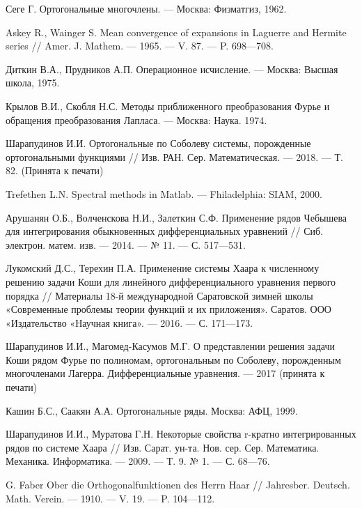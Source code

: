 \begin{thebibliography}{111}
{Сеге Г.}
Ортогональные многочлены. --- Москва: Физматгиз, 1962.


{Askey R., Wainger S.}
Mean convergence of expansions in Laguerre and Hermite series // Amer. J. Mathem. --- 1965. --- V. 87. --- P. 698---708.


{Диткин В.А., Прудников А.П.}
Операционное исчисление. --- Москва: Высшая школа, 1975.


{Крылов В.И., Скобля Н.С.}
Методы приближенного преобразования Фурье и обращения преобразования Лапласа. --- Москва: Наука. 1974.


Шарапудинов И.И. Ортогональные  по Соболеву системы, порожденные ортогональными функциями // Изв. РАН. Сер. Математическая. --- 2018. --- Т. 82. (Принята к печати)


{Trefethen  L.N.}
Spectral methods in Matlab. --- Fhiladelphia: SIAM, 2000.


{Арушанян О.Б., Волченскова Н.И., Залеткин С.Ф.}
Применение рядов Чебышева для интегрирования обыкновенных дифференциальных уравнений // Сиб. электрон. матем. изв. --- 2014. --- № 11. --- С. 517---531.


{Лукомский Д.С., Терехин П.А.}
Применение системы Хаара к численному решению задачи Коши для линейного дифференциального уравнения первого порядка // Материалы 18-й международной Саратовской зимней школы «Современные проблемы теории функций и их приложения». Саратов. ООО «Издательство «Научная книга». --- 2016. --- С. 171---173.


{Шарапудинов И.И., Магомед-Касумов М.Г.}
О представлении решения задачи Коши  рядом Фурье  по полиномам, ортогональным по  Соболеву, порожденным многочленами Лагерра. Дифференциальные уравнения. --- 2017 (принята к печати)


{Кашин Б.С., Саакян А.А.}
Ортогональные ряды. Москва: АФЦ, 1999.


{Шарапудинов И.И., Муратова Г.Н.}
Некоторые свойства r-кратно интегрированных рядов по системе Хаара // Изв. Сарат. ун-та. Нов. сер. Сер. Математика. Механика. Информатика. --- 2009. --- Т. 9. № 1. --- С. 68---76.


{G. Faber}
Ober die Orthogonalfunktionen des Herrn Haar // Jahresber. Deutsch. Math. Verein. --- 1910. --- V. 19. --- P. 104---112.



\end{thebibliography}

